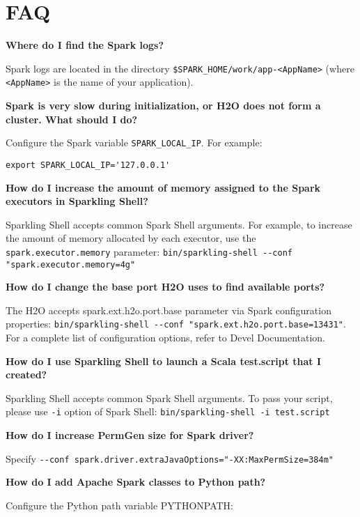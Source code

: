\section{FAQ}



\textbf{Where do I find the Spark logs?}

Spark logs are located in the directory {\lstinline[style=Bash]|$SPARK_HOME/work/app-<AppName>|} (where \texttt{<AppName>} is the name of your application).

\textbf{Spark is very slow during initialization, or H2O does not form a cluster. What should I do?}

Configure the Spark variable \texttt{SPARK\_LOCAL\_IP}. For example:
       
\begin{lstlisting}[style=Bash]
export SPARK_LOCAL_IP='127.0.0.1'
\end{lstlisting}

\textbf{How do I increase the amount of memory assigned to the Spark executors in Sparkling Shell?}

Sparkling Shell accepts common Spark Shell arguments. For example, to increase the amount of memory allocated by each executor, use the \texttt{spark.executor.memory} parameter: {\lstinline[style=Bash]|bin/sparkling-shell --conf "spark.executor.memory=4g"|}

\textbf{How do I change the base port H2O uses to find available ports?}

The H2O accepts spark.ext.h2o.port.base parameter via Spark configuration properties: {\lstinline[style=Bash]|bin/sparkling-shell --conf "spark.ext.h2o.port.base=13431"|}. For a complete list of configuration options, refer to Devel Documentation.

\textbf{How do I use Sparkling Shell to launch a Scala test.script that I created?}

Sparkling Shell accepts common Spark Shell arguments. To pass your script, please use \texttt{-i} option of Spark Shell: {\lstinline[style=Bash]|bin/sparkling-shell -i test.script|}

\textbf{How do I increase PermGen size for Spark driver?}

Specify {\lstinline[style=Bash]|--conf spark.driver.extraJavaOptions="-XX:MaxPermSize=384m"|}

\textbf{How do I add Apache Spark classes to Python path?}

Configure the Python path variable PYTHONPATH:
        
